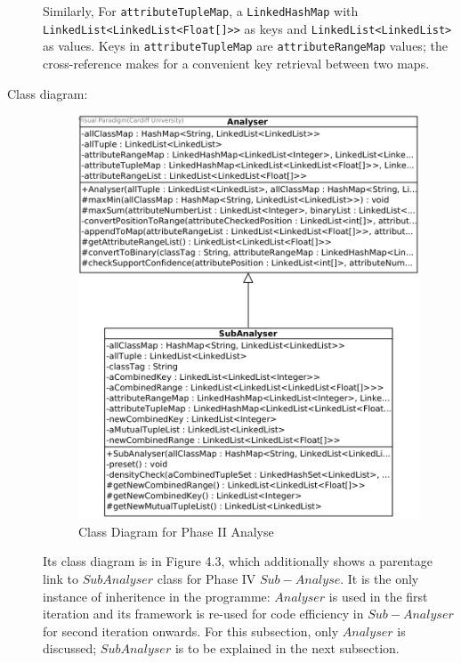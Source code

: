 \begin{description}
Similarly, For \texttt{attributeTupleMap}, a \texttt{LinkedHashMap} with \texttt{LinkedList<LinkedList<Float[]>>} as keys and \texttt{LinkedList<LinkedList>} as values. Keys in \texttt{attributeTupleMap} are \texttt{attributeRangeMap} values; the cross-reference makes for a convenient key retrieval between two maps. 

\item[Class diagram: ] 

\begin{figure}[!htbp]
    \centering
    \includegraphics[width=5in]{figures/class_analyser}
    \caption[Class Diagram for Phase II Analyse]{Class Diagram for Phase II Analyse}
    \label{fig:figure4_3}
\end{figure}

Its class diagram is in Figure 4.3, which additionally shows a parentage link to $SubAnalyser$ class for Phase IV $Sub-Analyse$. It is the only instance of inheritence in the programme: $Analyser$ is used in the first iteration and its framework is re-used for code efficiency in $Sub-Analyser$ for second iteration onwards. For this subsection, only $Analyser$ is discussed; $SubAnalyser$ is to be explained in the next subsection.


\end{description}
